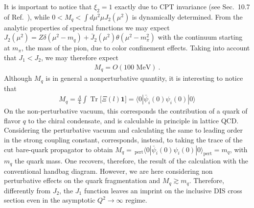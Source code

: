 \documentclass[preprintnumbers,floatfix,nofootinbib]{revtex4}
\newcommand{\todo}[1]{\marginpar{$\bullet$}\textbf{#1}}
\newcommand{\Tr}{\operatorname*{Tr}\nolimits} %
\newcommand{\mj}{M_q}
\newcommand{\mq}{m_q}
\begin{document}
It is important to notice that $\xi_2=1$ exactly due to CPT invariance
(see Sec.~10.7 of Ref.~\cite{Weinberg:1995mt}), while $0 < \mj < \int d\mu^2 \mu J_2(\mu^2)$ is
dynamically determined. From the analytic properties of spectral functions we
may expect \cite{Accardi:2008ne} $J_2(\mu^2) = Z \delta(\mu^2-m_q) + \bar J_2
(\mu^2) \theta (\mu^2-m_\pi^2)$ with the continuum starting at $m_\pi$, the
mass of the pion, due to color confinement effects. Taking into account that
$J_1 < J_2$, we may therefore expect  
\begin{align}
  \label{eq:mjet}
  \mj = O(100 \text{ MeV}) \ .
\end{align}
Although $\mj$ is in general a nonperturbative quantity, it is interesting to
notice that  
\begin{align}
  \label{eq:xi2_chiral_cond}
  \mj = \frac{\Lambda}{4} \int \Tr \big[ \Xi(l) \bm 1] 
   = \langle 0 | \bar \psi_i(0) \psi_i(0) | 0 \rangle
\end{align}
On the non-perturbative vacuum, this corresponds the contribution of a quark of flavor $q$ to the chiral condensate, and is calculable in principle in lattice QCD.
Considering the perturbative vacuum and calculating the same to leading order in the strong coupling constant, corresponds, instead, to taking the trace of the cut bare-quark propagator to obtain 
$\mj = \,_{\text{pert}} \langle 0
|  \bar \psi_i(0) \psi_i(0) | 0 \rangle_{\text{pert}}  = \mq$, with $\mq$ the quark mass. One recovers, therefore, the result of the calculation with the conventional handbag diagram. 
However, we are here considering non perturbative effects
on the quark fragmentation and $\mj \gtrsim \mq$. Therefore, differently from $J_2$, the $J_1$ function leaves an imprint on the inclusive DIS cross section even in the asymptotic $Q^2 \to \infty$ regime. 

\end{document}
